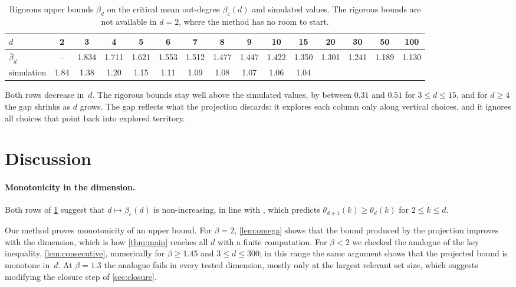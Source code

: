 \documentclass[11pt,letterpaper]{article}
\begin{document}
\begin{table}[h]
\centering\small
\setlength{\tabcolsep}{3.8pt}
\begin{tabular}{l*{14}{c}}
\toprule
$d$ & 2 & 3 & 4 & 5 & 6 & 7 & 8 & 9 & 10 & 15 & 20 & 30 & 50 & 100\\
\midrule
$\bar\beta_d$ & -- & 1.834 & 1.711 & 1.621 & 1.553 & 1.512 & 1.477 & 1.447 & 1.422 & 1.350 & 1.301 & 1.241 & 1.189 & 1.130\\
simulation & 1.84 & 1.38 & 1.20 & 1.15 & 1.11 & 1.09 & 1.08 & 1.07 & 1.06 & 1.04 & & & & \\
\bottomrule
\end{tabular}
\caption{Rigorous upper bounds $\bar\beta_d$ on the critical mean out-degree $\beta_{\mathrm c}(d)$ and simulated values. The rigorous bounds are not available in $d=2$, where the method has no room to start.}
\label{tab:bounds}
\end{table}

Both rows decrease in~$d$. The rigorous bounds stay well above the simulated values, by between $0.31$ and $0.51$ for $3\le d\le15$, and for $d\ge4$ the gap shrinks as $d$ grows. The gap reflects what the projection discards: it explores each column only along vertical choices, and it ignores all choices that point back into explored territory.

\section{Discussion}\label{sec:discussion}

\paragraph{Monotonicity in the dimension.}
Both rows of \cref{tab:bounds} suggest that $d\mapsto\beta_{\mathrm c}(d)$ is non-increasing, in line with \cite[Conjecture~3.2]{JKLT25}, which predicts $\theta_{d+1}(k)\ge\theta_d(k)$ for $2\le k\le d$.

Our method proves monotonicity of an upper bound. For $\beta=2$, \cref{lem:omega} shows that the bound produced by the projection improves with the dimension, which is how \cref{thm:main} reaches all $d$ with a finite computation. For $\beta<2$ we checked the analogue of the key inequality, \cref{lem:consecutive}, numerically for $\beta\ge1.45$ and $3\le d\le300$; in this range the same argument shows that the projected bound is monotone in~$d$. At $\beta=1.3$ the analogue fails in every tested dimension, mostly only at the largest relevant set size, which suggests modifying the closure step of \cref{sec:closure}.
\end{document}
